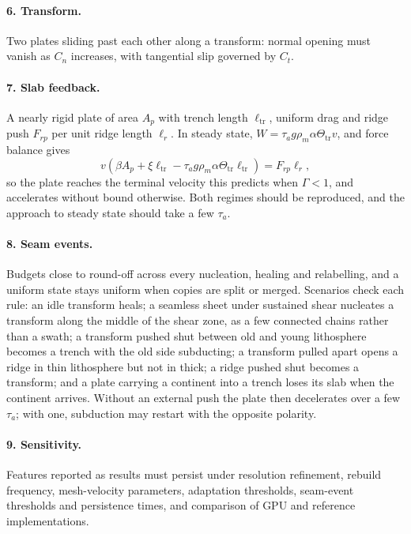 \documentclass[11pt]{article}
\begin{document}
\paragraph{6. Transform.} Two plates sliding past each other along a transform: normal opening must vanish as $C_n$ increases, with tangential slip governed by $C_t$.

\paragraph{7. Slab feedback.} A nearly rigid plate of area $A_p$ with trench length $\ell_{\mathrm{tr}}$, uniform drag and ridge push $F_{rp}$ per unit ridge length $\ell_r$. In steady state, $W=\tau_ag\rho_m\alpha\Theta_{\mathrm{tr}}v$, and force balance gives
\begin{equation}
  v\left(\beta A_p+\xi\ell_{\mathrm{tr}}-\tau_ag\rho_m\alpha\Theta_{\mathrm{tr}}\ell_{\mathrm{tr}}\right)=F_{rp}\ell_r,
\end{equation}
so the plate reaches the terminal velocity this predicts when $\Gamma<1$, and accelerates without bound otherwise. Both regimes should be reproduced, and the approach to steady state should take a few $\tau_a$.

\paragraph{8. Seam events.} Budgets close to round-off across every nucleation, healing and relabelling, and a uniform state stays uniform when copies are split or merged. Scenarios check each rule: an idle transform heals; a seamless sheet under sustained shear nucleates a transform along the middle of the shear zone, as a few connected chains rather than a swath; a transform pushed shut between old and young lithosphere becomes a trench with the old side subducting; a transform pulled apart opens a ridge in thin lithosphere but not in thick; a ridge pushed shut becomes a transform; and a plate carrying a continent into a trench loses its slab when the continent arrives. Without an external push the plate then decelerates over a few $\tau_a$; with one, subduction may restart with the opposite polarity.

\paragraph{9. Sensitivity.} Features reported as results must persist under resolution refinement, rebuild frequency, mesh-velocity parameters, adaptation thresholds, seam-event thresholds and persistence times, and comparison of GPU and reference implementations.
\end{document}

